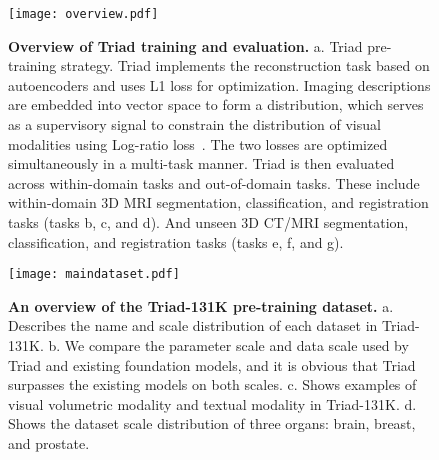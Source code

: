 \begin{figure}[t] 
	\centering
	\texttt{[image: overview.pdf]}
	\caption{\textbf{Overview of Triad training and evaluation.} a. Triad pre-training strategy. Triad implements the reconstruction task based on autoencoders and uses L1 loss for optimization. Imaging descriptions are embedded into vector space to form a distribution, which serves as a supervisory signal to constrain the distribution of visual modalities using Log-ratio loss~\cite{kim2019deep}. The two losses are optimized simultaneously in a multi-task manner. Triad is then evaluated across within-domain tasks and out-of-domain tasks. These include within-domain 3D MRI segmentation, classification, and registration tasks (tasks b, c, and d). And unseen 3D CT/MRI segmentation, classification, and registration tasks (tasks e, f, and g).}
	\label{fig:overview} 
\end{figure}
\begin{figure}[!h] 
	\centering
	\texttt{[image: maindataset.pdf]}
	\caption{\textbf{An overview of the Triad-131K pre-training dataset.} a. Describes the name and scale distribution of each dataset in Triad-131K. b. We compare the parameter scale and data scale used by Triad and existing foundation models, and it is obvious that Triad  surpasses the existing models on both scales. c. Shows examples of visual volumetric modality and textual modality in Triad-131K. d. Shows the dataset scale distribution of three organs: brain, breast, and prostate.}
	\label{fig:maindataset} 
\end{figure}


